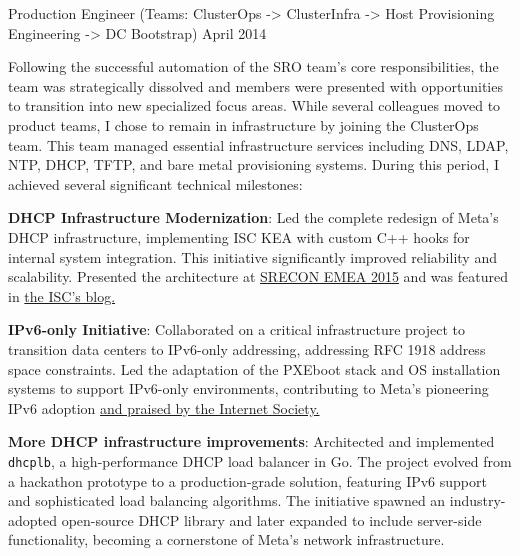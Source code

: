 \begin{cventries}
  \cventryprevrole
  {Production Engineer (Teams: ClusterOps -> ClusterInfra -> Host Provisioning Engineering -> DC Bootstrap)}
  {April 2014 }
  {
    Following the successful automation of the SRO team's core responsibilities, the team was strategically dissolved and
    members were presented with opportunities to transition into new specialized focus areas.
    While several colleagues moved to product teams, I chose to remain in infrastructure by joining the ClusterOps team.
    This team managed essential infrastructure services including DNS, LDAP, NTP, DHCP, TFTP, and bare metal provisioning systems.
    During this period, I achieved several significant technical milestones:
    \vspace{2mm}
    \begin{cvitems}
      \item {\textbf{DHCP Infrastructure Modernization}: Led the complete redesign of Meta's DHCP infrastructure,
                  implementing ISC KEA with custom C++ hooks for internal system integration. This initiative
                  significantly improved reliability and scalability. Presented the architecture at \href{https://www.usenix.org/conference/srecon15europe/program/presentation/failla}{SRECON EMEA 2015}
                  and was featured in \href{https://www.isc.org/blogs/how-facebook-is-using-kea-in-the-datacenter/}{the ISC's blog.}}
      \item {\textbf{IPv6-only Initiative}: Collaborated on a critical infrastructure project to transition
                  data centers to IPv6-only addressing, addressing RFC 1918 address space constraints. Led the
                  adaptation of the PXEboot stack and OS installation systems to support IPv6-only environments, contributing
                  to Meta's pioneering IPv6 adoption \href{https://www.internetsociety.org/resources/deploy360/2014/case-study-facebook-moving-to-an-ipv6-only-internal-network/}{and praised by the Internet Society.}}
      \item {\textbf{More DHCP infrastructure improvements}: Architected and implemented \texttt{dhcplb}, a high-performance
                  DHCP load balancer in Go. The project evolved from a hackathon prototype to a production-grade
                  solution, featuring IPv6 support and sophisticated load balancing algorithms. The initiative spawned
                  an industry-adopted open-source DHCP library and later expanded to include server-side functionality,
                  becoming a cornerstone of Meta's network infrastructure.}

\end{cvitems}}
\end{cventries}
